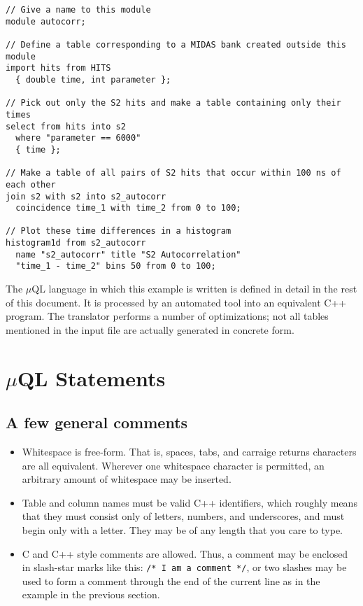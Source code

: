 \documentclass[12pt]{article}
\begin{document}
\begin{small}
\begin{verbatim}
// Give a name to this module 
module autocorr;

// Define a table corresponding to a MIDAS bank created outside this module 
import hits from HITS
  { double time, int parameter };

// Pick out only the S2 hits and make a table containing only their times
select from hits into s2
  where "parameter == 6000"
  { time };

// Make a table of all pairs of S2 hits that occur within 100 ns of each other
join s2 with s2 into s2_autocorr 
  coincidence time_1 with time_2 from 0 to 100;

// Plot these time differences in a histogram
histogram1d from s2_autocorr 
  name "s2_autocorr" title "S2 Autocorrelation" 
  "time_1 - time_2" bins 50 from 0 to 100;
\end{verbatim}
\end{small}

The $\mu$QL language in which this example is written is defined in detail in 
the rest of this document.  It is processed by an automated tool into an
equivalent C++ program.  The translator performs a number of optimizations;
not all tables mentioned in the input file are actually generated in concrete
form.  

\section{$\mu$QL Statements}

\subsection{A few general comments}

\begin{itemize}
\item Whitespace is free-form.  That is, spaces, tabs, and carraige returns
  characters are all equivalent.  Wherever one whitespace character is
  permitted, an arbitrary amount of whitespace may be inserted.
\item Table and column names must be valid C++ identifiers, which roughly 
  means that they must consist only of letters, numbers, and underscores,
  and must begin only with a letter.  They may be of any length that you care
  to type.
\item C and C++ style comments are allowed.  Thus, a comment may be enclosed
  in slash-star marks like this: {\tt /* I am a comment */}, or two slashes
  may be used to form a comment through the end of the current line as in
  the example in the previous section.
\end{itemize}
\end{document}
